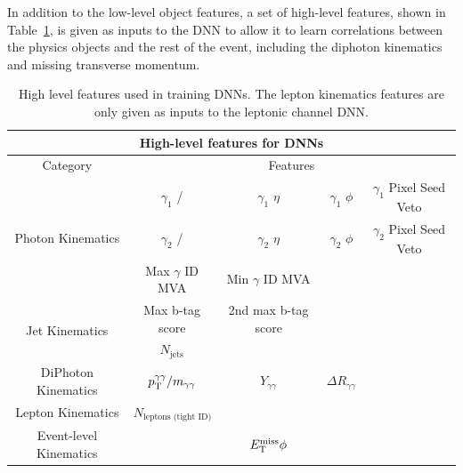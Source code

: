In addition to the low-level object features, a set of high-level features, shown in Table~\ref{tab:tth_hlf_dnn}, is given as inputs to the DNN to allow it to learn correlations between the physics objects and the rest of the event, including the diphoton kinematics and missing transverse momentum.
\begin{table}[h] \scriptsize
	\centering
	\renewcommand{\arraystretch}{1.5}
	\begin{tabular}{c| c c c c}
		\multicolumn{5}{c}{High-level features for DNNs} \\ \hline
		Category & \multicolumn{4}{c}{Features} \\ \hline
		\multirow{3}{*}{Photon Kinematics} & $\gamma_1$ \pT/\mgg & $\gamma_1$ $\eta$ & $\gamma_1$ $\phi$ & $\gamma_1$ Pixel Seed Veto \\
		& $\gamma_2$ \pT/\mgg & $\gamma_2$ $\eta$ & $\gamma_2$ $\phi$ & $\gamma_2$ Pixel Seed Veto \\
		& Max $\gamma$ ID MVA & Min $\gamma$ ID MVA & & \\ \hline
		\multirow{2}{*}{Jet Kinematics} & Max b-tag score & 2nd max b-tag score & & \\
		& $N_{\text{jets}}$ & & & \\ \hline
		\multirow{1}{*}{DiPhoton Kinematics} & $p_{\mathrm{T}}^{\gamma \gamma} / m_{\gamma\gamma}$ & $Y_{\gamma \gamma}$ & $\Delta R_{\gamma \gamma}$ & \\ \hline
		\multirow{1}{*}{Lepton Kinematics} & $N_{\text{leptons (tight ID)}}$ & & & \\ \hline
		\multirow{1}{*}{Event-level Kinematics} & \met & $E_{\text{T}}^{\text{miss}} \phi$ & & \\ \hline
	\end{tabular}
	\caption{High level features used in training DNNs. The lepton kinematics features are only given as inputs to the leptonic channel DNN.} 
	\label{tab:tth_hlf_dnn}
\end{table}

